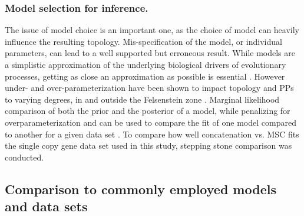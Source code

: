\documentclass[fleqn,10pt,lineno]{wlpeerj} %
\begin{document}
\subsubsection*{Model selection for inference.} 
The issue of model choice is an important one, as the choice of model can heavily influence the resulting topology. 
Mis-specification of the model, or individual parameters, can lead to a well supported but erroneous result. 
While models are a simplistic approximation of the underlying biological drivers of evolutionary processes, getting as close an approximation as possible is essential \citep{box1979all}. 
However under- and over-parameterization have been shown to impact topology and PPs to varying degrees, in and outside the Felsenstein zone \citep{lemmon2004importance}. 
Marginal likelihood comparison of both the prior and the posterior of a model, while penalizing for overparameterization and can be used to compare the fit of one model compared to another for a given data set \citep{xie2010improving}. 
To compare how well concatenation vs. MSC fits the single copy gene data set used in this study, stepping stone comparison was conducted.

\subsection*{Comparison to commonly employed models and data sets}
\end{document}
